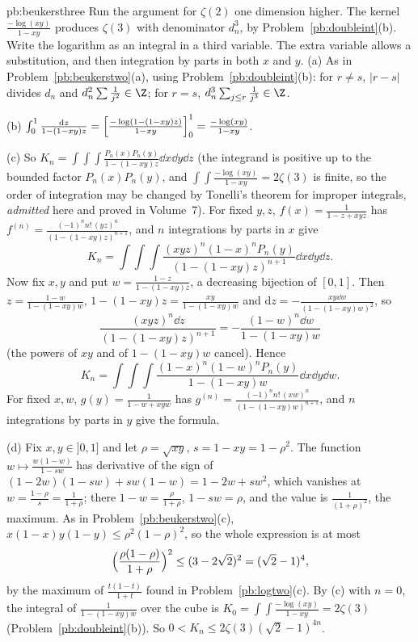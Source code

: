 \begin{solution}{pb:beukersthree}
\idea Run the argument for $\zeta(2)$ one dimension higher. The kernel $\frac{-\log(xy)}{1-xy}$ produces $\zeta(3)$ with denominator $d_n^3$, by Problem~\ref{pb:doubleint}(b). Write the logarithm as an integral in a third variable. The extra variable allows a substitution, and then integration by parts in both $x$ and $y$.
\writeup (a) As in Problem~\ref{pb:beukerstwo}(a), using Problem~\ref{pb:doubleint}(b): for $r\ne s$, $|r-s|$ divides $d_n$ and $d_n^2\sum\frac1{j^2}\in\Z$; for
$r=s$, $d_n^3\sum_{j\le r}\frac1{j^3}\in\Z$.

(b) $\int_0^1\frac{\mathrm dz}{1-(1-xy)z}=\Bigl[\frac{-\log(1-(1-xy)z)}{1-xy}\Bigr]_0^1=\frac{-\log(xy)}{1-xy}$.

(c) So $K_n=\int\!\!\int\!\!\int\frac{P_n(x)P_n(y)}{1-(1-xy)z}\dd x\dd y\dd z$ (the integrand is positive up to the bounded factor $P_n(x)P_n(y)$, and
$\int\!\!\int\frac{-\log(xy)}{1-xy}=2\zeta(3)$ is finite, so the order of integration may be changed by Tonelli's theorem for improper integrals, \emph{admitted} here and proved in Volume~7). For fixed $y,z$, $f(x)=\frac1{1-z+xyz}$ has
$f^{(n)}=\frac{(-1)^nn!\,(yz)^n}{(1-(1-xy)z)^{n+1}}$, and $n$ integrations by parts in $x$ give
\[
K_n=\int\!\!\int\!\!\int\frac{(xyz)^n(1-x)^nP_n(y)}{(1-(1-xy)z)^{n+1}}\dd x\dd y\dd z.
\]
Now fix $x,y$ and put $w=\frac{1-z}{1-(1-xy)z}$, a decreasing bijection of $[0,1]$. Then $z=\frac{1-w}{1-(1-xy)w}$,
$1-(1-xy)z=\frac{xy}{1-(1-xy)w}$ and $\mathrm dz=-\frac{xy\dd w}{(1-(1-xy)w)^2}$, so
\[
\frac{(xyz)^n\dd z}{(1-(1-xy)z)^{n+1}}=-\frac{(1-w)^n\dd w}{1-(1-xy)w}
\]
(the powers of $xy$ and of $1-(1-xy)w$ cancel). Hence
\[
K_n=\int\!\!\int\!\!\int\frac{(1-x)^n(1-w)^nP_n(y)}{1-(1-xy)w}\dd x\dd y\dd w.
\] For fixed $x,w$,
$g(y)=\frac1{1-w+xyw}$ has $g^{(n)}=\frac{(-1)^nn!\,(xw)^n}{(1-(1-xy)w)^{n+1}}$, and $n$ integrations by parts in $y$ give the formula.

(d) Fix $x,y\in]0,1]$ and let $\rho=\sqrt{xy}$, $s=1-xy=1-\rho^2$. The function $w\mapsto\frac{w(1-w)}{1-sw}$ has derivative of the sign of
$(1-2w)(1-sw)+sw(1-w)=1-2w+sw^2$, which vanishes at $w=\frac{1-\rho}{s}=\frac1{1+\rho}$; there $1-w=\frac\rho{1+\rho}$, $1-sw=\rho$, and the value
is $\frac1{(1+\rho)^2}$, the maximum. As in Problem~\ref{pb:beukerstwo}(c), $x(1-x)y(1-y)\le\rho^2(1-\rho)^2$, so the whole expression is at most
\[
\Bigl(\frac{\rho(1-\rho)}{1+\rho}\Bigr)^2\le(3-2\sqrt2)^2=(\sqrt2-1)^4,
\]
by the maximum of $\frac{t(1-t)}{1+t}$ found in Problem~\ref{pb:logtwo}(c). By (c) with $n=0$, the integral of $\frac1{1-(1-xy)w}$ over the cube is
$K_0=\int\!\!\int\frac{-\log(xy)}{1-xy}=2\zeta(3)$ (Problem~\ref{pb:doubleint}(b)). So $0<K_n\le2\zeta(3)(\sqrt2-1)^{4n}$.


\end{solution}
